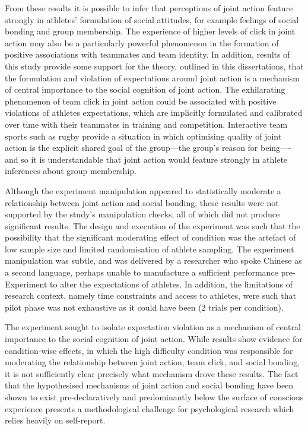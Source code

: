 From these results it is possible to infer that perceptions of joint action feature strongly in athletes' formulation of social attitudes, for example feelings of social bonding and group membership.  The experience of higher levels of click in joint action may also be a particularly powerful phenomenon in the formation of positive associations with teammates and team identity.  In addition, results of this study provide some support for the theory, outlined in this dissertations, that the formulation and violation of expectations around joint action is a mechanism of central importance to the social cognition of joint action.  The exhilarating phenomenon of team click in joint action could be associated with positive violations of athletes expectations, which are implicitly formulated and calibrated over time with their teammates in training and competition.  Interactive team sports such as rugby provide a situation in which optimising quality of joint action is the explicit shared goal of the group---the group's reason for being----and so it is understandable that joint action would feature strongly in athlete inferences about group membership.


Although the experiment manipulation appeared to statistically moderate a relationship between joint action and social bonding, these results were not supported by the study's manipulation checks, all of which did not produce significant results.  The design and execution of the experiment was such that the possibility that the significant moderating effect of condition was the artefact of low sample size and limited randomisation of athlete sampling. The experiment manipulation was subtle, and was delivered by a researcher who spoke Chinese as a second language, perhaps unable to manufacture a sufficient performance pre-Experiment to alter the expectations of athletes. In addition, the limitations of research context, namely time constraints and access to athletes, were such that pilot phase was not exhaustive as it could have been (2 trials per condition).

The experiment sought to isolate expectation violation as a mechanism of central importance to the social cognition of joint action.  While results show evidence for condition-wise effects, in which the high difficulty condition was responsible for moderating the relationship between joint action, team click, and social bonding, it is not sufficiently clear precisely what mechanism drove these results.
The fact that the hypothesised mechanisms of joint action and social bonding have been shown to exist pre-declaratively and predominantly below the surface of conscious experience presents a methodological challenge for psychological research which relies heavily on self-report.

